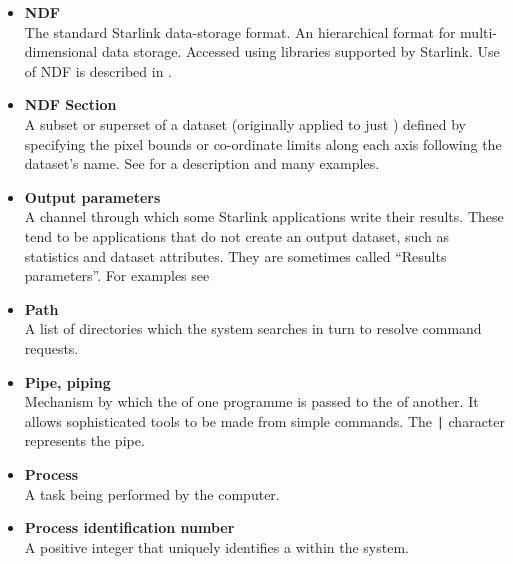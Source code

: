 \begin{itemize}
\item {\bf\label{sc4_gl_ndf}NDF}\\
      The standard Starlink data-storage format.  An hierarchical format for
      multi-dimensional data storage.  Accessed using libraries supported
      by Starlink.  Use of NDF is described in .

\item {\bf\label{sc4_gl_ndf_se}NDF Section}\\
      A subset or superset of a dataset (originally applied to just
      ) defined by specifying the pixel bounds
      or co-ordinate limits along each axis following the dataset's name.
      See  for a description
      and many examples.

\item {\bf\label{sc4_gl_opar}Output parameters}\\
      A channel through which some Starlink applications write their
      results.  These tend to be applications that do not create an
      output dataset, such as statistics and dataset attributes.  They
      are sometimes called ``Results parameters''.  For examples see
\begin{htmlonly}
\end{htmlonly}

\item {\bf\label{sc4_gl_path}Path}\\
      A list of directories which the system searches in turn to
      resolve command requests.

\item {\bf\label{sc4_gl_pipe}Pipe, piping}\\
      Mechanism by which the 
      of one programme is passed to the  of another.  It allows sophisticated tools
      to be made from simple commands.  The {\tt |} character
      represents the pipe.

\item {\bf\label{sc4_gl_pro}Process}\\
      A task being performed by the computer.

\item {\bf\label{sc4_gl_pid}Process identification number}\\
      A positive integer that uniquely identifies a
       within the system.


\end{itemize}
